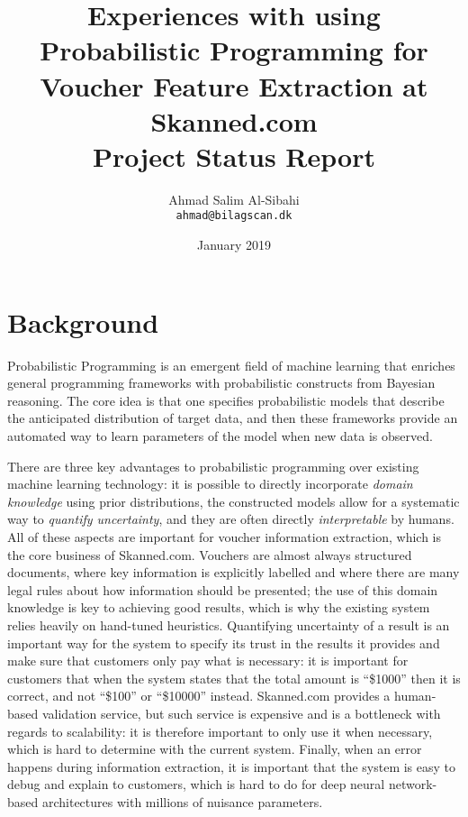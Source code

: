 \documentclass[12pt,a4paper]{article}
\title{
  \vspace{3.5cm}
  \LARGE{Experiences with using Probabilistic Programming for Voucher Feature
    Extraction at Skanned.com} \\
  \Large{Project Status Report}
}
\author{
  \Large{Ahmad Salim Al-Sibahi} \\
  \texttt{ahmad@bilagscan.dk}
}
\date{January 2019}
\def \ColourPDF {cover/bilagscan-farve.pdf}
\begin{document}
 

\clearpage\maketitle
\thispagestyle{empty}

\newpage


\section{Background}
Probabilistic Programming is an emergent field of machine learning that
enriches general programming frameworks with probabilistic constructs from Bayesian reasoning.
The core idea is that one specifies probabilistic models that describe the
anticipated distribution of target data, and then these frameworks provide an
automated way to learn parameters of the model when new data is observed.

There are three key advantages to probabilistic programming over existing
machine learning technology: it is possible to directly incorporate \emph{domain
knowledge} using prior distributions, the constructed models allow for a systematic way to
\emph{quantify uncertainty}, and they are often directly
\emph{interpretable} by humans. All of these aspects are important for voucher
information extraction, which is the core business of Skanned.com.
Vouchers are almost always structured documents, where key information is
explicitly labelled and where there are many legal rules about how
information should be presented; the use of this domain knowledge is key to
achieving good results, which is why the existing system relies heavily on
hand-tuned heuristics. Quantifying uncertainty of a result is an important way
for the system to specify its trust in the results it provides and make sure
that customers only pay what is necessary: it is important for customers that
when the system states that the total amount is ``\$1000'' then it is correct,
and not ``\$100'' or ``\$10000'' instead. Skanned.com provides a
human-based validation service, but such service is expensive and is a
bottleneck with regards to scalability: it is therefore important to only use
it when necessary, which is hard to determine with the current system.
Finally, when an error happens during information extraction, it is important that
the system is easy to debug and explain to customers, which is hard to do for
deep neural network-based architectures with millions of nuisance parameters.
\end{document}
